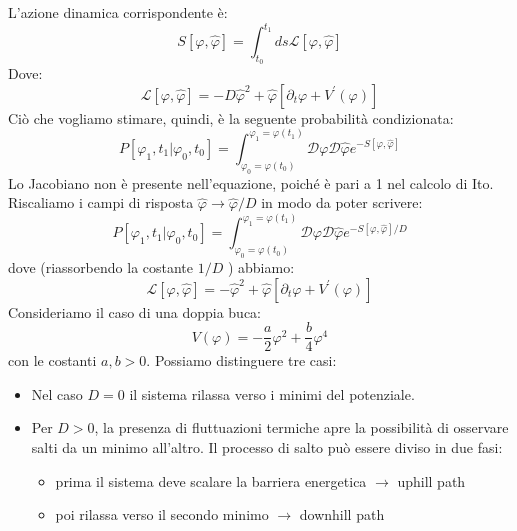 L'azione dinamica corrispondente è:
\begin{equation}
S[\varphi,\hat{\varphi}]=\int_{t_{0}}^{t_{1}}ds\mathcal{L}[\varphi,\hat{\varphi}]
\end{equation}
Dove:
\begin{equation}
\mathcal{L}[\varphi,\hat{\varphi}]=-D\hat{\varphi}^{2}+\hat{\varphi}[\partial_{t}\varphi+V^{\prime}(\varphi)]
\end{equation}
Ciò che vogliamo stimare, quindi, è la seguente probabilità condizionata:
\begin{equation}
P[\varphi_{1},t_{1}|\varphi_{0},t_{0}]=\int_{\varphi_{0}=\varphi(t_{0})}^{\varphi_{1}=\varphi(t_{1})}\mathcal{D}\varphi\mathcal{D}\hat{\varphi}e^{-S[\varphi,\hat{\varphi}]}
\end{equation}
Lo Jacobiano non è presente nell’equazione, poiché è pari a 1 nel calcolo di Ito.
Riscaliamo i campi di risposta $\hat{\varphi}\rightarrow\hat{\varphi}/D$ in modo da poter scrivere:
\begin{equation}
P[\varphi_{1},t_{1}|\varphi_{0},t_{0}]=\int_{\varphi_{0}=\varphi(t_{0})}^{\varphi_{1}=\varphi(t_{1})}\mathcal{D}\varphi\mathcal{D}\hat{\varphi}e^{-S[\varphi,\hat{\varphi}]/D}
\end{equation}
dove (riassorbendo la costante $1/D$ ) abbiamo:
\begin{equation}
\mathcal{L}[\varphi,\hat{\varphi}]=-\hat{\varphi}^{2}+\hat{\varphi}[\partial_{t}\varphi+V^{\prime}(\varphi)]
\end{equation}
Consideriamo il caso di una doppia buca:
\begin{equation}
V(\varphi)=-\frac{a}{2}\varphi^{2}+\frac{b}{4}\varphi^{4}
\end{equation}
con le costanti $a, b>0$.
Possiamo distinguere tre casi:
\begin{itemize}
    \item Nel caso $D=0$ il sistema rilassa verso i minimi del potenziale.
    \item Per $D>0$, la presenza di fluttuazioni termiche apre la possibilità di osservare salti da un minimo all'altro. Il processo di salto può essere diviso in due fasi:
    \begin{itemize}
        \item prima il sistema deve scalare la barriera energetica $\longrightarrow$ uphill path
        \item poi rilassa verso il secondo minimo $\longrightarrow$ downhill path
    \end{itemize}
\end{itemize}

